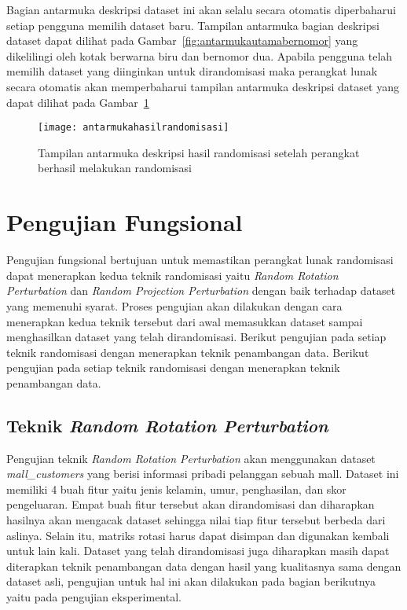 Bagian antarmuka deskripsi dataset ini akan selalu secara otomatis diperbaharui setiap pengguna memilih dataset baru. Tampilan antarmuka bagian deskripsi dataset dapat dilihat pada Gambar~\ref{fig:antarmukautamabernomor} yang dikelilingi oleh kotak berwarna biru dan bernomor dua. Apabila pengguna telah memilih dataset yang diinginkan untuk dirandomisasi maka perangkat lunak secara otomatis akan memperbaharui tampilan antarmuka deskripsi dataset yang dapat dilihat pada Gambar~\ref{fig:antarmukahasilrandomisasi}

\begin{figure}
	\centering
	\texttt{[image: antarmukahasilrandomisasi]}
	\caption{Tampilan antarmuka deskripsi hasil randomisasi setelah perangkat berhasil melakukan randomisasi}
	\label{fig:antarmukahasilrandomisasi}
\end{figure}

\section{Pengujian Fungsional}
\label{sec:pengujianfungsional}

Pengujian fungsional bertujuan untuk memastikan perangkat lunak randomisasi dapat menerapkan kedua teknik randomisasi yaitu \textit{Random Rotation Perturbation} dan \textit{Random Projection Perturbation} dengan baik terhadap dataset yang memenuhi syarat. Proses pengujian akan dilakukan dengan cara menerapkan kedua teknik tersebut dari awal memasukkan dataset sampai menghasilkan dataset yang telah dirandomisasi. Berikut pengujian pada setiap teknik randomisasi dengan menerapkan teknik penambangan data. Berikut pengujian pada setiap teknik randomisasi dengan menerapkan teknik penambangan data.

\subsection{Teknik \textit{Random Rotation Perturbation}}
\label{subsec:rrp-fungsional}

Pengujian teknik \textit{Random Rotation Perturbation} akan menggunakan dataset \textit{mall\_customers} yang berisi informasi pribadi pelanggan sebuah mall. Dataset ini memiliki 4 buah fitur yaitu jenis kelamin, umur, penghasilan, dan skor pengeluaran. Empat buah fitur tersebut akan dirandomisasi dan diharapkan hasilnya akan mengacak dataset sehingga nilai tiap fitur tersebut berbeda dari aslinya. Selain itu, matriks rotasi harus dapat disimpan dan digunakan kembali untuk lain kali. Dataset yang telah dirandomisasi juga diharapkan masih dapat diterapkan teknik penambangan data dengan hasil yang kualitasnya sama dengan dataset asli, pengujian untuk hal ini akan dilakukan pada bagian berikutnya yaitu pada pengujian eksperimental.

